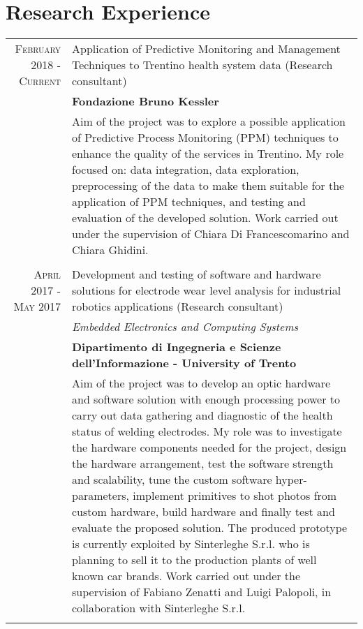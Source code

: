 \documentclass[a4paper,10pt]{article}
\begin{document}
\section{Research Experience}
\begin{longtable}{r|p{8.5cm}}

 \textsc{February 2018 - Current} & Application of Predictive Monitoring and Management Techniques to Trentino health system data (Research consultant) \\
 &\textbf{Fondazione Bruno Kessler}\\
 &\footnotesize{Aim of the project was to explore a possible application of Predictive Process Monitoring (PPM) techniques to enhance the quality of the services in Trentino. My role focused on: data integration, data exploration, preprocessing of the data to make them suitable for the application of PPM techniques, and testing and evaluation of the developed solution. Work carried out under the supervision of Chiara Di Francescomarino and Chiara Ghidini.}\\\multicolumn{2}{c}{} \\

\textsc{April 2017 - May 2017} & Development and testing of software and hardware solutions for electrode wear level analysis for industrial robotics applications (Research consultant)\\
  &\emph{Embedded Electronics and Computing Systems}\\
 &\textbf{Dipartimento di Ingegneria e Scienze dell’Informazione - University of Trento}\\
 &\footnotesize{Aim of the project was to develop an optic hardware and software solution with enough processing power to carry out data gathering and diagnostic of the health status of welding electrodes. My role was to investigate the hardware components needed for the project, design the hardware arrangement, test the software strength and scalability, tune the custom software hyper-parameters, implement primitives to shot photos from custom hardware, build hardware and finally test and evaluate the proposed solution. The produced prototype is currently exploited by Sinterleghe S.r.l. who is planning to sell it to the production plants of well known car brands. Work carried out under the supervision of Fabiano Zenatti and Luigi Palopoli, in collaboration with Sinterleghe S.r.l.}\\\multicolumn{2}{c}{} \\
 

\end{longtable}
\end{document}

